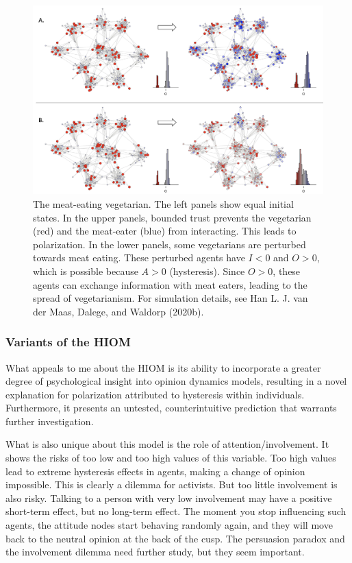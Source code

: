 \documentclass[
  a4paper,
  DIV=11,
  numbers=noendperiod]{scrreprt}
\begin{document}
\begin{figure}

{\centering \includegraphics{media/ch7/image12.jpg}

}

\caption{\label{fig-ch7-img12-old-100}The meat-eating vegetarian. The
left panels show equal initial states. In the upper panels, bounded
trust prevents the vegetarian (red) and the meat-eater (blue) from
interacting. This leads to polarization. In the lower panels, some
vegetarians are perturbed towards meat eating. These perturbed agents
have \(I < 0\) and \(O > 0\), which is possible because \(A > 0\)
(hysteresis). Since \(O > 0\), these agents can exchange information
with meat eaters, leading to the spread of vegetarianism. For simulation
details, see Han L. J. van der Maas, Dalege, and Waldorp (2020b).}

\end{figure}

\hypertarget{sec-Variants-of-the-HIOM}{%
\subsubsection{Variants of the HIOM}\label{sec-Variants-of-the-HIOM}}

What appeals to me about the HIOM is its ability to incorporate a
greater degree of psychological insight into opinion dynamics models,
resulting in a novel explanation for polarization attributed to
hysteresis within individuals. Furthermore, it presents an untested,
counterintuitive prediction that warrants further investigation.

What is also unique about this model is the role of
attention/involvement. It shows the risks of too low and too high values
of this variable. Too high values lead to extreme hysteresis effects in
agents, making a change of opinion impossible. This is clearly a dilemma
for activists. But too little involvement is also risky. Talking to a
person with very low involvement may have a positive short-term effect,
but no long-term effect. The moment you stop influencing such agents,
the attitude nodes start behaving randomly again, and they will move
back to the neutral opinion at the back of the cusp. The persuasion
paradox and the involvement dilemma need further study, but they seem
important.
\end{document}
